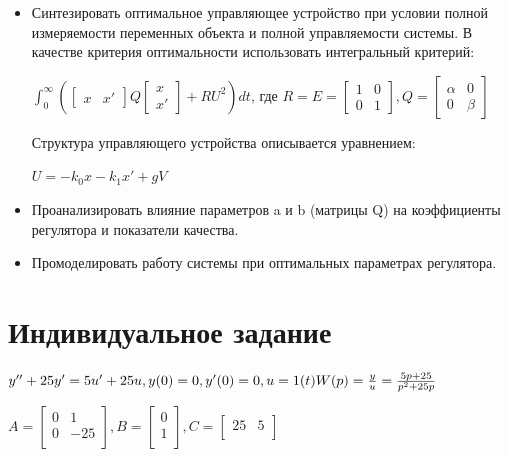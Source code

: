 \documentclass[14pt,a4paper,report]{report}
\begin{document}
\begin{itemize}
	\item Синтезировать оптимальное управляющее устройство при условии полной измеряемости переменных объекта и полной управляемости системы. В качестве критерия оптимальности использовать интегральный критерий:
	
	$\int_{0}^{\infty}(\begin{bmatrix}
	x & x' 
	\end{bmatrix}Q\begin{bmatrix}
	x \\
	x' 
	\end{bmatrix}+RU^2)dt
	$, где $R=E=\begin{bmatrix}
	1 & 0 \\
	0 & 1 
	\end{bmatrix}, Q=\begin{bmatrix}
	\alpha & 0 \\
	0 & \beta 
	\end{bmatrix}$
	
	Структура управляющего устройства описывается уравнением:

	$U=-k_0x-k_1x'+gV$
	
	\item Проанализировать влияние параметров a и b (матрицы Q) на коэффициенты регулятора и показатели качества.
	\item Промоделировать работу системы при оптимальных параметрах регулятора.
\end{itemize}

\section{Индивидуальное задание}

$
\\
y''+25y'=5u'+25u, y(0)=0, y'(0)=0, u=1(t)\\\\
W(p)=\frac{y}{u}=\frac{5p+25}{p^2+25p} \\
$

$A=
	\begin{bmatrix}
	0 & 1 \\
	0 & -25 \\
	\end{bmatrix}
	, B=
	\begin{bmatrix}
	0 \\
	1 \\
	\end{bmatrix}
	, C=
	\begin{bmatrix}
	25 & 5 \\
	\end{bmatrix}
	$
	
\end{document}
